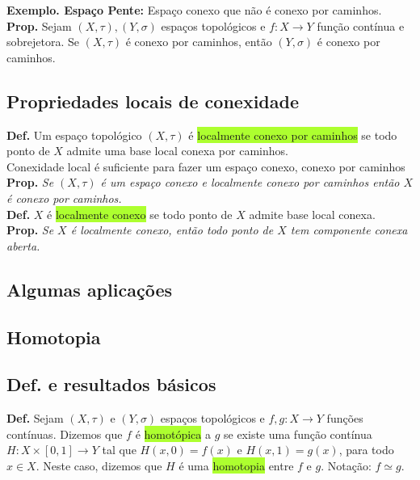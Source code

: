 \documentclass{article}
\begin{document}
\begin{landscape}
\begin{multicols}{3}
\textbf{Exemplo. Espaço Pente:} Espaço conexo que não é conexo por caminhos.\\

\textbf{Prop.} Sejam $(X,\tau), (Y,\sigma)$ espaços topológicos e $f : X \to Y$ função contínua e sobrejetora. Se $(X,\tau)$ é conexo por caminhos, então $(Y,\sigma)$ é conexo por caminhos.

\subsection{Propriedades locais de conexidade}
\textbf{Def.} Um espaço topológico $(X, \tau)$ é \colorbox{GreenYellow}{localmente conexo por caminhos} se todo ponto de $X$ admite uma base local conexa por caminhos.\\

 \color{Emerald}Conexidade local é suficiente para fazer um espaço conexo, conexo por caminhos \color{black}\\
 \textbf{Prop.} \textit{Se $(X, \tau)$ é um espaço conexo e localmente conexo por caminhos então $X$ é conexo por caminhos.}\\

 \textbf{Def.} $X$ é \colorbox{GreenYellow}{localmente conexo} se todo ponto de $X$ admite base local conexa.\\

 \textbf{Prop.} \textit{Se $X$ é localmente conexo, então todo ponto de $X$ tem componente conexa aberta.}

 \subsection{Algumas aplicações}
 \end{multicols}
 \begin{center}
     
 \section{Homotopia}
 \end{center}
 \begin{multicols}{3}

  \subsection{Def. e resultados básicos}

 \textbf{Def.} Sejam \( (X, \tau) \) e \( (Y, \sigma) \) espaços topológicos e \( f, g : X \to Y \) funções contínuas. Dizemos que \( f \) é \colorbox{GreenYellow}{homotópica} a \( g \) se existe uma função contínua $H : X \times [0,1] \to Y$ tal que $H(x,0) = f(x)$ e $H(x,1) = g(x)$, para todo $x \in X$.
Neste caso, dizemos que \( H \) é uma \colorbox{GreenYellow}{homotopia} entre \( f \) e \( g \). Notação: \( f \simeq g \).\\


\end{multicols}
\end{landscape}
\end{document}
